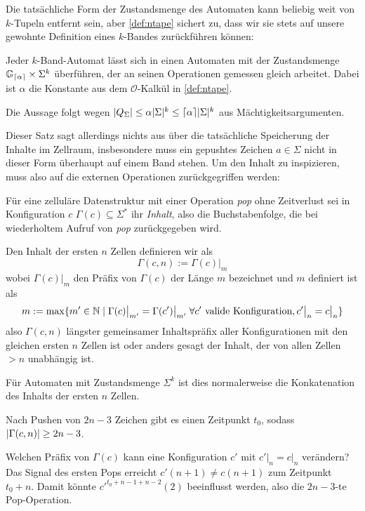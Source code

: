 \documentclass{article}
\begin{document}
Die tatsächliche Form der Zustandsmenge des Automaten kann beliebig weit von $k$-Tupeln entfernt sein, aber \eqref{def:ntape} sichert zu, dass wir sie stets auf unsere gewohnte Definition eines $k$-Bandes zurückführen können:

\begin{satz}
    \label{thm:tape-hom}
    Jeder $k$-Band-Automat lässt sich in einen Automaten mit der Zustandsmenge $\mathbb{G}_{\lceil\alpha\rceil} \times \Sigma^k$ überführen, der an seinen Operationen gemessen gleich arbeitet. Dabei ist $\alpha$ die Konstante aus dem $\mathcal{O}$-Kalkül in \eqref{def:ntape}.

    \begin{beweis}
        Die Aussage folgt wegen $\lvert Q_\Sigma\rvert \leq \alpha \lvert\Sigma\rvert^k \leq \lceil\alpha\rceil \lvert\Sigma\rvert^k$ aus Mächtigkeitsargumenten.
    \end{beweis}
\end{satz}

Dieser Satz sagt allerdings nichts aus über die tatsächliche Speicherung der Inhalte im Zellraum, insbesondere muss ein gepushtes Zeichen $a \in \Sigma$ nicht in dieser Form überhaupt auf einem Band stehen. Um den Inhalt zu inspizieren, muss also auf die externen Operationen zurückgegriffen werden:

\begin{definition}
    Für eine zelluläre Datenstruktur mit einer Operation \emph{pop} ohne Zeitverlust sei in Konfiguration $c$ $\Gamma(c) \subseteq \Sigma^*$ ihr \emph{Inhalt}, also die Buchstabenfolge, die bei wiederholtem Aufruf von \emph{pop} zurückgegeben wird.

    Den Inhalt der ersten $n$ Zellen definieren wir als
        \[ \Gamma(c,n) := \Gamma(c) \big|_m \]
    wobei $\Gamma(c) \big|_m$ den Präfix von $\Gamma(c)$ der Länge $m$ bezeichnet und $m$ definiert ist als
    \[ m := \max \{m' \in \mathbb{N} \mid \Gamma(c) \big|_{m'} = \Gamma(c') \big|_{m'} \;\forall c' \text{ valide Konfiguration}, c' \big|_n = c \big|_n \} \]
    also $\Gamma(c,n)$ längster gemeinsamer Inhaltspräfix aller Konfigurationen mit den gleichen ersten $n$ Zellen ist oder anders gesagt der Inhalt, der von allen Zellen $> n$ unabhängig ist.

    Für Automaten mit Zustandsmenge $\Sigma^k$ ist dies normalerweise die Konkatenation des Inhalts der ersten $n$ Zellen.
\end{definition}

\begin{satz}
    \label{thm:locontent}
    Nach Pushen von $2n-3$ Zeichen gibt es einen Zeitpunkt $t_0$, sodass $\lvert\Gamma(c,n)\rvert \geq 2n-3$.
    \begin{beweis}
        Welchen Präfix von $\Gamma(c)$ kann eine Konfiguration $c'$ mit $c' \big|_n = c \big|_n$ verändern? Das Signal des ersten Pops erreicht $c'(n+1) \neq c(n+1)$ zum Zeitpunkt $t_0+n$. Damit könnte $c'^{t_0+n-1+n-2}(2)$ beeinflusst werden, also die $2n-3$-te Pop-Operation.
    \end{beweis}
\end{satz}
\end{document}
